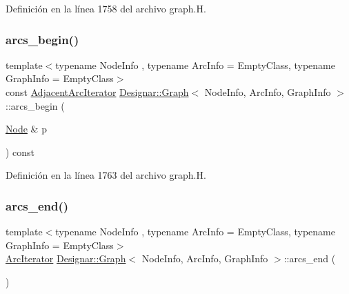 Definición en la línea 1758 del archivo graph.\+H.

\mbox{\label{class_designar_1_1_graph_a2c527f6bddb0ff454fd6139f2437c27b}} 
\subsubsection{\texorpdfstring{arcs\+\_\+begin()}{arcs\_begin()}\hspace{0.1cm}{\footnotesize\ttfamily [4/4]}}
{\footnotesize\ttfamily template$<$typename Node\+Info , typename Arc\+Info  = Empty\+Class, typename Graph\+Info  = Empty\+Class$>$ \\
const \hyperlink{class_designar_1_1_graph_1_1_adjacent_arc_iterator}{Adjacent\+Arc\+Iterator} \hyperlink{class_designar_1_1_graph}{Designar\+::\+Graph}$<$ Node\+Info, Arc\+Info, Graph\+Info $>$\+::arcs\+\_\+begin (\begin{DoxyParamCaption}\item[{\hyperlink{class_designar_1_1_graph_a5dfc7dba9d092ac489c72e40390c37d0}{Node} \&}]{p }\end{DoxyParamCaption}) const\hspace{0.3cm}{\ttfamily [inline]}}



Definición en la línea 1763 del archivo graph.\+H.

\mbox{\label{class_designar_1_1_graph_a57a43c94f28df5958e912554d640bdaa}} 
\subsubsection{\texorpdfstring{arcs\+\_\+end()}{arcs\_end()}\hspace{0.1cm}{\footnotesize\ttfamily [1/4]}}
{\footnotesize\ttfamily template$<$typename Node\+Info , typename Arc\+Info  = Empty\+Class, typename Graph\+Info  = Empty\+Class$>$ \\
\hyperlink{class_designar_1_1_graph_1_1_arc_iterator}{Arc\+Iterator} \hyperlink{class_designar_1_1_graph}{Designar\+::\+Graph}$<$ Node\+Info, Arc\+Info, Graph\+Info $>$\+::arcs\+\_\+end (\begin{DoxyParamCaption}{ }\end{DoxyParamCaption})\hspace{0.3cm}{\ttfamily [inline]}}



